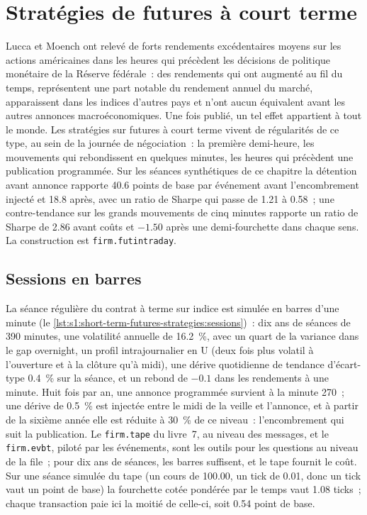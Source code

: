 \chapter{Stratégies de futures à court terme}\label{ch:s1:short-term-futures-strategies}

Lucca et Moench ont relevé de forts rendements excédentaires moyens sur les actions américaines dans les heures qui précèdent les décisions de politique monétaire de la Réserve fédérale~: des rendements
qui ont augmenté au fil du temps, représentent une part notable du rendement annuel du marché, apparaissent dans les indices d'autres pays et n'ont aucun équivalent avant les autres
annonces macroéconomiques. Une fois publié, un tel effet appartient à tout le monde. Les stratégies sur futures à court terme vivent de régularités de ce type, au sein de la
journée de négociation~: la première demi-heure, les mouvements qui rebondissent en quelques minutes, les heures qui précèdent une publication programmée. Sur les séances synthétiques de ce chapitre
la détention avant annonce rapporte 40.6 points de base par événement avant l'encombrement injecté et 18.8 après, avec un ratio de Sharpe qui passe de 1.21 à
0.58~; une contre-tendance sur les grands mouvements de cinq minutes rapporte un ratio de Sharpe de 2.86 avant coûts et $-1.50$ après une demi-fourchette dans chaque sens. La construction est
\texttt{firm.futintraday}.

\section{Sessions en barres}

La séance régulière du contrat à terme sur indice est simulée en barres d'une minute (le \cref{lst:s1:short-term-futures-strategies:sessions})~: dix ans de séances
de 390 minutes, une volatilité annuelle de 16.2~\%, avec un quart de la variance dans le gap overnight, un profil intrajournalier en U (deux fois plus volatil à l'ouverture et
à la clôture qu'à midi), une dérive quotidienne de tendance d'écart-type 0.4~\% sur la séance, et un rebond de $-0.1$ dans les rendements à une minute. Huit fois par
an, une annonce programmée survient à la minute 270~; une dérive de 0.5~\% est injectée entre le midi de la veille et l'annonce, et à partir de la sixième
année elle est réduite à 30~\% de ce niveau~: l'encombrement qui suit la publication. Le \texttt{firm.tape} du livre~7, au niveau des messages, et le \texttt{firm.evbt}, piloté par les événements, sont
les outils pour les questions au niveau de la file~; pour dix ans de séances, les barres suffisent, et le tape fournit le coût. Sur une séance simulée du tape (un cours de
100.00, un tick de 0.01, donc un tick vaut un point de base) la fourchette cotée pondérée par le temps vaut 1.08 ticks~; chaque transaction paie ici la moitié de celle-ci, soit 0.54 point de base.

